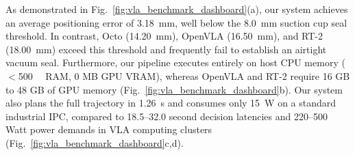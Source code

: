 \documentclass{svproc}
\begin{document}
\begin{table}[t!]
\caption{Concise Comparison: Proposed Modular ROS 2 Stack vs. End-to-End VLA Models.}
\label{tab:vla_comparison}
\centering
{}
\end{table}

As demonstrated in Fig.~\ref{fig:vla_benchmark_dashboard}(a), our system achieves an average positioning error of \SI{3.18}{\milli\meter}, well below the \SI{8.0}{\milli\meter} suction cup seal threshold. In contrast, Octo (\SI{14.20}{\milli\meter}), OpenVLA (\SI{16.50}{\milli\meter}), and RT-2 (\SI{18.00}{\milli\meter}) exceed this threshold and frequently fail to establish an airtight vacuum seal. Furthermore, our pipeline executes entirely on host CPU memory ($<$\SI{500}{\mega\byte} RAM, 0 MB GPU VRAM), whereas OpenVLA and RT-2 require 16 GB to 48 GB of GPU memory (Fig.~\ref{fig:vla_benchmark_dashboard}b). Our system also plans the full trajectory in \SI{1.26}{\second} and consumes only \SI{15}{\watt} on a standard industrial IPC, compared to 18.5--32.0 second decision latencies and 220--500 Watt power demands in VLA computing clusters (Fig.~\ref{fig:vla_benchmark_dashboard}c,d).
\end{document}
